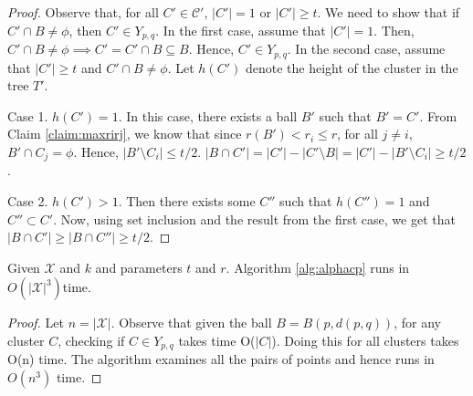 \documentclass[11pt]{article}
\newcommand{\mc}{\mathcal}
\newtheorem{fact}[theorem]{Fact}
\begin{document}
\begin{proof}
Observe that, for all $C' \in \mc C'$, $|C'| = 1$ or $|C'| \ge t$. We need to show that if $C' \cap B \neq \phi$, then $C' \in Y_{p,q}$. In the first case, assume that $|C'| = 1$. Then, $C' \cap B \neq \phi \implies C' = C' \cap B \subseteq B$. Hence, $C' \in Y_{p,q}$. In the second case, assume that $|C'|\ge t$ and $C' \cap B \neq \phi$. Let $h(C')$ denote the height of the cluster in the tree $T'$.

Case 1. $h(C') = 1$. In this case, there exists a ball $B'$ such that $B' = C'$. From Claim \ref{claim:maxrirj}, we know that since $r(B') < r_i \le r$, for all $j \neq i$, $B' \cap C_j = \phi$. Hence, $|B'\setminus C_i| \le t/2$. $|B\cap C'| = |C'| - |C'\setminus B| = |C'| - |B'\setminus C_i| \ge t/2$.

Case 2. $h(C') > 1$. Then there exists some $C''$ such that $h(C'') = 1$ and $C'' \subset C'$. Now, using set inclusion and the result from the first case, we get that $|B\cap C'| \ge |B\cap C''| \ge t/2$. 

\end{proof}

\begin{theorem}
Given $\mc X$ and $k$ and parameters $t$ and $r$. Algorithm \ref{alg:alphacp} runs in $O(|\mc X|^3)$time.
\end{theorem}

\begin{proof}
Let $n = |\mc X|$. Observe that given the ball $B = B(p, d(p, q))$, for any cluster $C$, checking if $C \in Y_{p, q}$ takes time O($|C|$). Doing this for all clusters takes O(n) time. The algorithm examines all the pairs of points and hence runs in $O(n^3)$ time.
\end{proof}
\end{document}

